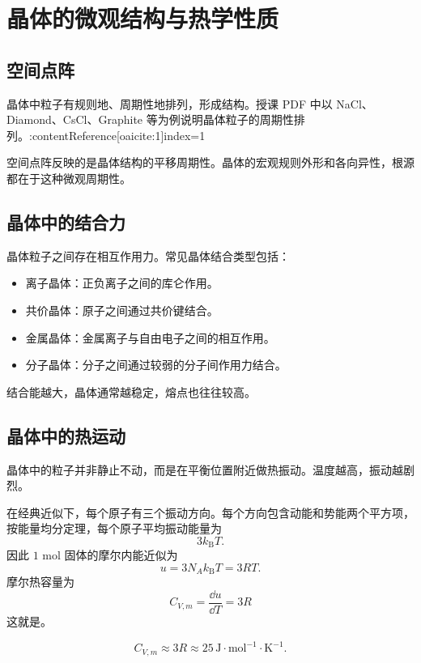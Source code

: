 \section{晶体的微观结构与热学性质}

\subsection{空间点阵}

晶体中粒子有规则地、周期性地排列，形成结构。授课 PDF 中以 NaCl、Diamond、CsCl、Graphite 等为例说明晶体粒子的周期性排列。:contentReference[oaicite:1]{index=1}

空间点阵反映的是晶体结构的平移周期性。晶体的宏观规则外形和各向异性，根源都在于这种微观周期性。

\subsection{晶体中的结合力}

晶体粒子之间存在相互作用力。常见晶体结合类型包括：
\begin{itemize}
  \item 离子晶体：正负离子之间的库仑作用。
  \item 共价晶体：原子之间通过共价键结合。
  \item 金属晶体：金属离子与自由电子之间的相互作用。
  \item 分子晶体：分子之间通过较弱的分子间作用力结合。
\end{itemize}

结合能越大，晶体通常越稳定，熔点也往往较高。

\subsection{晶体中的热运动}

晶体中的粒子并非静止不动，而是在平衡位置附近做热振动。温度越高，振动越剧烈。

在经典近似下，每个原子有三个振动方向。每个方向包含动能和势能两个平方项，按能量均分定理，每个原子平均振动能量为
\[
  3k_{\mathrm B}T.
\]
因此 \(1\) mol 固体的摩尔内能近似为
\[
  u=3N_Ak_{\mathrm B}T=3RT.
\]
摩尔热容量为
\[
  \boxed{
  C_{V,m}=\frac{\dd u}{\dd T}=3R
  }
\]
这就是。

\begin{FormulaBox}[固体经典热容量]
\[
  \boxed{
  C_{V,m}\approx3R\approx25\,\mathrm{J\cdot mol^{-1}\cdot K^{-1}}
  }.
\]
\end{FormulaBox}

